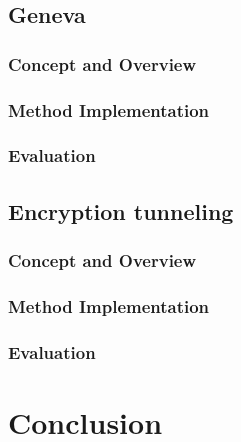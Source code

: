 \documentclass[12pt, fleqn, a4paper]{article}
\begin{document}
\subsection{Geneva}
\subsubsection{Concept and Overview}
\subsubsection{Method Implementation}
\subsubsection{Evaluation}
\subsection{Encryption tunneling}
\subsubsection{Concept and Overview}
\subsubsection{Method Implementation}
\subsubsection{Evaluation}
\section*{\centering Conclusion}

%
\end{document}
